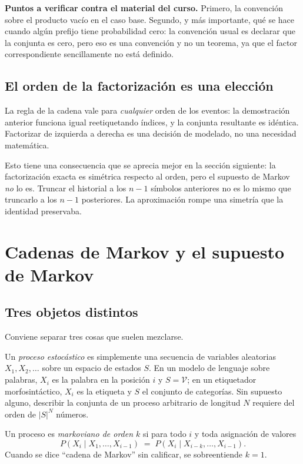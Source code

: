 \documentclass[11pt,letterpaper]{article}
\newcommand{\Vocab}{\mathcal{V}}
\begin{document}
\begin{observacion}
\textbf{Puntos a verificar contra el material del curso.} Primero, la convención
sobre el producto vacío en el caso base. Segundo, y más importante, qué se hace
cuando algún prefijo tiene probabilidad cero: la convención usual es declarar
que la conjunta es cero, pero eso es una convención y no un teorema, ya que el
factor correspondiente sencillamente no está definido.
\end{observacion}

\subsection{El orden de la factorización es una elección}

La regla de la cadena vale para \emph{cualquier} orden de los eventos: la
demostración anterior funciona igual reetiquetando índices, y la conjunta
resultante es idéntica. Factorizar de izquierda a derecha es una decisión de
modelado, no una necesidad matemática.

Esto tiene una consecuencia que se aprecia mejor en la sección siguiente: la
factorización exacta es simétrica respecto al orden, pero el supuesto de Markov
\emph{no} lo es. Truncar el historial a los $n-1$ símbolos anteriores no es lo
mismo que truncarlo a los $n-1$ posteriores. La aproximación rompe una simetría
que la identidad preservaba.

\section{Cadenas de Markov y el supuesto de Markov}

\subsection{Tres objetos distintos}

Conviene separar tres cosas que suelen mezclarse.

Un \emph{proceso estocástico} es simplemente una secuencia de variables
aleatorias $X_1,X_2,\dots$ sobre un espacio de estados $S$. En un modelo de
lenguaje sobre palabras, $X_i$ es la palabra en la posición $i$ y $S=\Vocab$; en
un etiquetador morfosintáctico, $X_i$ es la etiqueta y $S$ el conjunto de
categorías. Sin supuesto alguno, describir la conjunta de un proceso arbitrario
de longitud $N$ requiere del orden de $|S|^N$ números.

\begin{definicion}
Un proceso es \emph{markoviano de orden $k$} si para todo $i$ y toda asignación
de valores
\[
P(X_i \mid X_1,\dots,X_{i-1}) \;=\; P(X_i \mid X_{i-k},\dots,X_{i-1}).
\]
Cuando se dice ``cadena de Markov'' sin calificar, se sobreentiende $k=1$.
\end{definicion}
\end{document}
